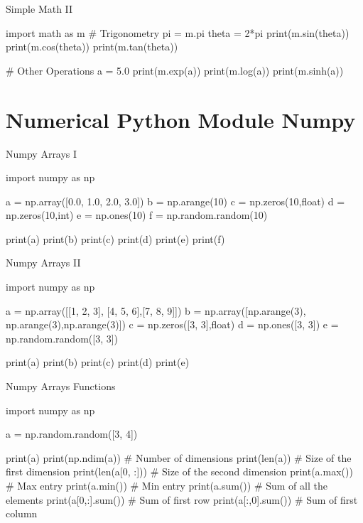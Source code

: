 \documentclass[11pt]{beamer}
\begin{document}
\begin{frame}[fragile]{Simple Math II}
\footnotesize
\begin{semiverbatim}
import math as m
# Trigonometry 
pi = m.pi
theta = 2*pi
print(m.sin(theta)) 
print(m.cos(theta))
print(m.tan(theta))

# Other Operations
a = 5.0
print(m.exp(a))
print(m.log(a))
print(m.sinh(a))
\end{semiverbatim}
\end{frame}


\section{Numerical Python Module Numpy}
\begin{frame}[fragile]{Numpy Arrays I}
\footnotesize
\begin{semiverbatim}
import numpy as np

a = np.array([0.0, 1.0, 2.0, 3.0])
b = np.arange(10)
c = np.zeros(10,float)
d = np.zeros(10,int)
e = np.ones(10)
f = np.random.random(10)

print(a)
print(b)
print(c)
print(d)
print(e)
print(f)
\end{semiverbatim}
\end{frame}

\begin{frame}[fragile]{Numpy Arrays II}
\footnotesize
\begin{semiverbatim}
import numpy as np

a = np.array([[1, 2, 3], [4, 5, 6],[7, 8, 9]])
b = np.array([np.arange(3), np.arange(3),np.arange(3)])
c = np.zeros([3, 3],float)
d = np.ones([3, 3])
e = np.random.random([3, 3])

print(a)
print(b)
print(c)
print(d)
print(e)
\end{semiverbatim}
\end{frame}

\begin{frame}[fragile]{Numpy Arrays Functions}
\footnotesize
\begin{semiverbatim}
import numpy as np

a = np.random.random([3, 4])

print(a)
print(np.ndim(a))    # Number of dimensions
print(len(a))            # Size of the first dimension
print(len(a[0, :]))    # Size of the second dimension
print(a.max())         # Max entry
print(a.min())          # Min entry
print(a.sum())         # Sum of all the elements
print(a[0,:].sum())  # Sum of first row
print(a[:,0].sum())  # Sum of first column
\end{semiverbatim}
\end{frame}
\end{document}
